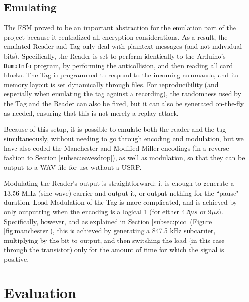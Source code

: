 \documentclass[fleqn,10pt]{SelfArx} %
\newcommand{\ms}{\ensuremath{\mu s} }
\begin{document}
\subsection{Emulating}
\label{subsec:emulate}

The FSM proved to be an important abstraction for the emulation part of the project because it centralized all encryption considerations. As a result, the emulated Reader and Tag only deal with plaintext messages (and not individual bits). Specifically, the Reader is set to perform identically to the Arduino's \texttt{DumpInfo} program, by performing the anticollision, and then reading all card blocks. The Tag is programmed to respond to the incoming commands, and its memory layout is set dynamically through files. For reproducibility (and especially when emulating the tag against a recording), the randomness used by the Tag and the Reader can also be fixed, but it can also be generated on-the-fly as needed, ensuring that this is not merely a replay attack.

Because of this setup, it is possible to emulate both the reader and the tag simultaneously, without needing to go through encoding and modulation, but we have also coded the Manchester and Modified Miller encodings (in a reverse fashion to Section \ref{subsec:eavesdrop}), as well as modulation, so that they can be output to a WAV file for use without a USRP.

Modulating the Reader's output is straightforward: it is enough to generate a 13.56 MHz (sine wave) carrier and output it, or output nothing for the ``pause" duration. Load Modulation of the Tag is more complicated, and is achieved by only outputting when the encoding is a logical 1 (for either 4.5\ms or 9$\mu s$). Specifically, however, and as explained in Section \ref{subsec:picc} (Figure \ref{fig:manchester}), this is achieved by generating a 847.5 kHz subcarrier, multiplying by the bit to output, and then switching the load (in this case through the transistor) only for the amount of time for which the signal is positive.



\section{Evaluation}
\label{sec:evaluation}
\end{document}
